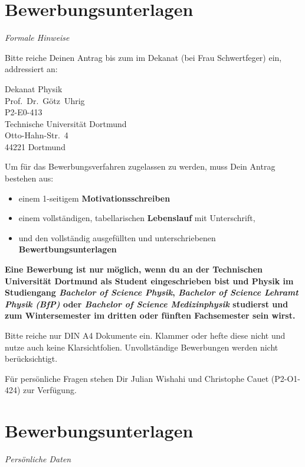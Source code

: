 \documentclass[
  paper=a4,
  fontsize=12pt,
  DIV=16,
  headheight=52pt,
  footheight=45pt,
  headinclude,
  parskip=full,
]{scrartcl}
\date{31. Juli 2014}
\begin{document}
\section*{Bewerbungsunterlagen}
\emph{Formale Hinweise}

Bitte reiche Deinen Antrag bis zum \thedate{} im Dekanat (bei Frau Schwertfeger) ein,
addressiert an:

Dekanat Physik\\
Prof.~Dr.~Götz~Uhrig\\
P2-E0-413\\[0.5\baselineskip]
Technische Universität Dortmund\\
Otto-Hahn-Str.~4\\
44221 Dortmund

Um für das Bewerbungsverfahren zugelassen zu werden, muss Dein Antrag bestehen aus:
\begin{itemize}
  \item einem 1-seitigem \textbf{Motivationsschreiben}
  \item einem vollständigen, tabellarischen \textbf{Lebenslauf} mit Unterschrift,
  \item und den vollständig ausgefüllten und unterschriebenen \textbf{Bewertbungsunterlagen}
\end{itemize}

\textbf{%
  Eine Bewerbung ist nur möglich, wenn du an der Technischen Universität Dortmund als Student eingeschrieben bist und Physik im Studiengang \emph{Bachelor of Science Physik},
  \emph{Bachelor of Science Lehramt Physik (BfP)} oder \emph{Bachelor of Science Medizinphysik} studierst und zum Wintersemester im dritten oder fünften Fachsemester sein wirst.
}

Bitte reiche nur DIN A4 Dokumente ein. Klammer oder hefte diese nicht und nutze auch
keine Klarsichtfolien. Unvollständige Bewerbungen werden nicht berücksichtigt.

Für persönliche Fragen stehen Dir Julian Wishahi und Christophe Cauet (P2-O1-424) zur
Verfügung.

\newpage
\section*{Bewerbungsunterlagen}
\emph{Persönliche Daten}
\end{document}
